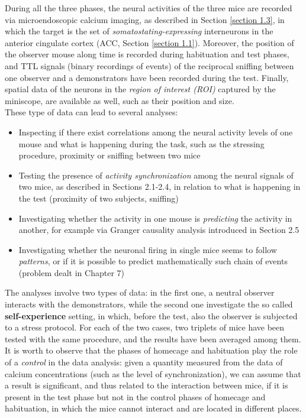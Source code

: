 \documentclass[12pt, a4paper]{report}
\begin{document}
During all the three phases, the neural activities of the three mice are recorded via microendoscopic calcium imaging, as described in Section \ref{section 1.3}, in which the target is the set of \textit{somatostating-expressing} interneurons in the anterior cingulate cortex (ACC, Section \ref{section 1.1}). Moreover, the position of the observer mouse along time is recorded during habituation and test phases, and TTL signals (binary recordings of events) of the reciprocal sniffing between one observer and a demonstrators have been recorded during the test. Finally, spatial data of the neurons in the \textit{region of interest (ROI)} captured by the miniscope, are available as well, such as their position and size.\\
These type of data can lead to several analyses:
\begin{itemize}
	
	\item Inspecting if there exist correlations among the neural activity levels of one mouse and what is happening during the task, such as the stressing procedure, proximity or sniffing between two mice
	
	\item Testing the presence of \textit{activity synchronization} among the neural signals of two mice, as described in Sections 2.1-2.4, in relation to what is happening in the test (proximity of two subjects, sniffing)
	
	\item Investigating whether the activity in one mouse is \textit{predicting} the activity in another, for example via  Granger causality analysis introduced in Section 2.5
	
	\item Investigating whether the neuronal firing in single mice seems to follow \textit{patterns}, or if it is possible to predict mathematically such chain of events (problem dealt in Chapter 7)
\end{itemize}


The analyses involve two types of data: in the first one, a neutral observer interacts with the demonstrators, while the second one investigate the so called \textbf{self-experience} setting, in which, before the test, also the observer is subjected to a stress protocol. For each of the two cases, two triplets of mice have been tested with the same procedure, and the results have been averaged among them.\\
It is worth to observe that the phases of homecage and habituation play the role of a \textit{control} in the data analysis: given a quantity measured from the data of calcium concentrations (such as the level of synchronization), we can assume that a result is significant, and thus related to the interaction between mice, if it is present in the test phase but not in the control phases of homecage and habituation, in which the mice cannot interact and are located in different places.
\end{document}
